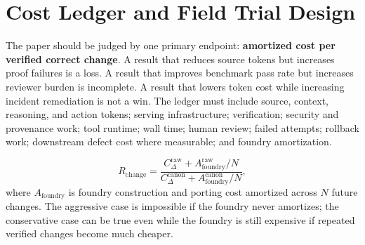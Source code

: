 \section{Cost Ledger and Field Trial Design}
\label{sec:cost-ledger}

The paper should be judged by one primary endpoint: \textbf{amortized cost per verified correct change}. A result that reduces source tokens but increases proof failures is a loss. A result that improves benchmark pass rate but increases reviewer burden is incomplete. A result that lowers token cost while increasing incident remediation is not a win. The ledger must include source, context, reasoning, and action tokens; serving infrastructure; verification; security and provenance work; tool runtime; wall time; human review; failed attempts; rollback work; downstream defect cost where measurable; and foundry amortization.

\begin{equation}
R_{\mathrm{change}}=\frac{C^{\mathrm{raw}}_{\Delta}+A^{\mathrm{raw}}_{\mathrm{foundry}}/N}{C^{\mathrm{canon}}_{\Delta}+A^{\mathrm{canon}}_{\mathrm{foundry}}/N},
\end{equation}
where $A_{\mathrm{foundry}}$ is foundry construction and porting cost amortized across $N$ future changes. The aggressive case is impossible if the foundry never amortizes; the conservative case can be true even while the foundry is still expensive if repeated verified changes become much cheaper.

